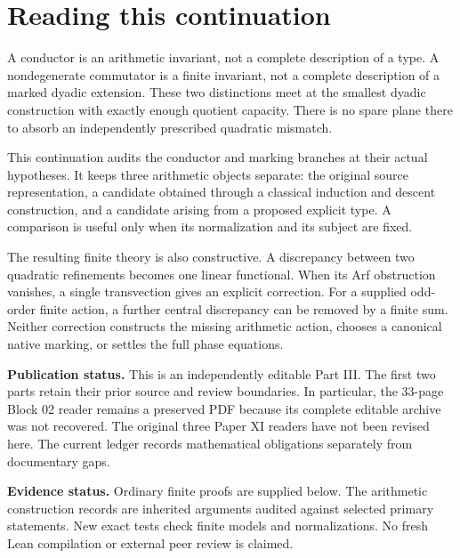 \documentclass[11pt]{article}
\theoremstyle{definition}\newtheorem{definition}[proposition]{Definition}
\begin{document}
\KomorebiCover
\section*{Reading this continuation}
A conductor is an arithmetic invariant, not a complete description of a type. A nondegenerate commutator is a finite invariant, not a complete description of a marked dyadic extension. These two distinctions meet at the smallest dyadic construction with exactly enough quotient capacity. There is no spare plane there to absorb an independently prescribed quadratic mismatch.

This continuation audits the conductor and marking branches at their actual hypotheses. It keeps three arithmetic objects separate: the original source representation, a candidate obtained through a classical induction and descent construction, and a candidate arising from a proposed explicit type. A comparison is useful only when its normalization and its subject are fixed.

The resulting finite theory is also constructive. A discrepancy between two quadratic refinements becomes one linear functional. When its Arf obstruction vanishes, a single transvection gives an explicit correction. For a supplied odd-order finite action, a further central discrepancy can be removed by a finite sum. Neither correction constructs the missing arithmetic action, chooses a canonical native marking, or settles the full phase equations.

\textbf{Publication status.} This is an independently editable Part III. The first two parts retain their prior source and review boundaries. In particular, the 33-page Block 02 reader remains a preserved PDF because its complete editable archive was not recovered. The original three Paper XI readers have not been revised here. The current ledger records mathematical obligations separately from documentary gaps.

\textbf{Evidence status.} Ordinary finite proofs are supplied below. The arithmetic construction records are inherited arguments audited against selected primary statements. New exact tests check finite models and normalizations. No fresh Lean compilation or external peer review is claimed.

\tableofcontents
\clearpage









\end{document}
